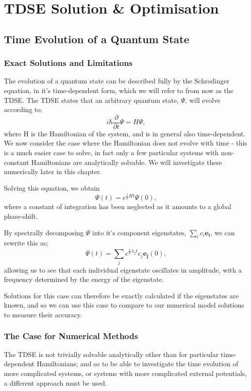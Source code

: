 
\chapter{TDSE Solution \& Optimisation} %

\label{Chapter3} %



\section{Time Evolution of a Quantum State}
\subsection{Exact Solutions and Limitations}
The evolution of a quantum state can be described fully by the Schr$\ddot{o}$dinger equation, in it's time-dependent form, which we will refer to from now as the TDSE. The TDSE states that an arbitrary quantum state, $\Psi$, will evolve according to;
$$ 
i \hbar \frac{\partial}{\partial t} \Psi=H \Psi,
$$
where H is the Hamiltonian of the system, and is in general also time-dependent. We now consider the case where the Hamiltonian does not evolve with time - this is a much easier case to solve, in fact only a few particular systems with non-constant Hamiltonians are analytically solvable. We will investigate these numerically later in this chapter.

Solving this equation, we obtain 
$$
\Psi\left(t\right) = e^{\frac{i}{\hbar}Ht}\Psi\left(0\right),
$$
where a constant of integration has been neglected as it amounts to a global phase-shift.

By spectrally decomposing $\Psi$ into it's component eigenstates, $\sum_{i}{c_{i}\mathbf{e_{i}}}$, we can rewrite this as;
$$
\Psi\left(t\right) = \sum_{j}{e^{\frac{i}{\hbar}\lambda_{j}t}c_{j}\mathbf{e_{j}}\left(0\right)},
$$
allowing us to see that each individual eigenstate oscillates in amplitude, with a frequency determined by the energy of the eigenstate.

Solutions for this case can therefore be exactly calculated if the eigenstates are known, and so we can use this case to compare to our numerical model solutions to measure their accuracy.

\subsection{The Case for Numerical Methods}
The TDSE is not trivially solvable analytically other than for particular time-dependent Hamiltonians; and so to be able to investigate the time evolution of more complicated systems, or systems with more complicated external potentials, a different approach must be used. 

